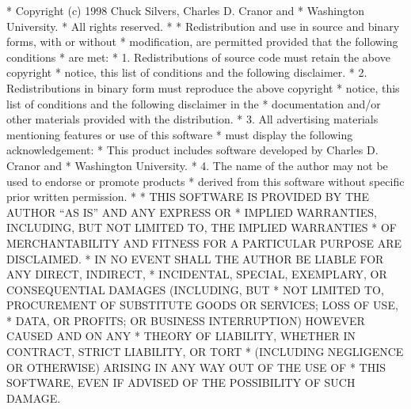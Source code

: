 \begin{copyrightEnv}
 * Copyright (c) 1998 Chuck Silvers, Charles D. Cranor and
 *                    Washington University.
 * All rights reserved.
 *
 * Redistribution and use in source and binary forms, with or without
 * modification, are permitted provided that the following conditions
 * are met:
 * 1. Redistributions of source code must retain the above copyright
 *    notice, this list of conditions and the following disclaimer.
 * 2. Redistributions in binary form must reproduce the above copyright
 *    notice, this list of conditions and the following disclaimer in the
 *    documentation and/or other materials provided with the distribution.
 * 3. All advertising materials mentioning features or use of this software
 *    must display the following acknowledgement:
 *      This product includes software developed by Charles D. Cranor and
 *      Washington University.
 * 4. The name of the author may not be used to endorse or promote products
 *    derived from this software without specific prior written permission.
 *
 * THIS SOFTWARE IS PROVIDED BY THE AUTHOR ``AS IS'' AND ANY EXPRESS OR
 * IMPLIED WARRANTIES, INCLUDING, BUT NOT LIMITED TO, THE IMPLIED WARRANTIES
 * OF MERCHANTABILITY AND FITNESS FOR A PARTICULAR PURPOSE ARE DISCLAIMED.
 * IN NO EVENT SHALL THE AUTHOR BE LIABLE FOR ANY DIRECT, INDIRECT,
 * INCIDENTAL, SPECIAL, EXEMPLARY, OR CONSEQUENTIAL DAMAGES (INCLUDING, BUT
 * NOT LIMITED TO, PROCUREMENT OF SUBSTITUTE GOODS OR SERVICES; LOSS OF USE,
 * DATA, OR PROFITS; OR BUSINESS INTERRUPTION) HOWEVER CAUSED AND ON ANY
 * THEORY OF LIABILITY, WHETHER IN CONTRACT, STRICT LIABILITY, OR TORT
 * (INCLUDING NEGLIGENCE OR OTHERWISE) ARISING IN ANY WAY OUT OF THE USE OF
 * THIS SOFTWARE, EVEN IF ADVISED OF THE POSSIBILITY OF SUCH DAMAGE.
\end{copyrightEnv}

